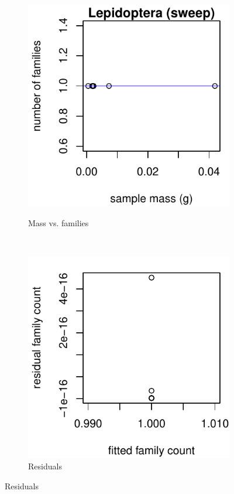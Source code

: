\documentclass[10pt,letterpaper,twocolumn]{article}
\begin{document}
\begin{figure}[h]
	\centering
	\begin{subfigure}[b]{0.15\textwidth}
		\caption{Mass vs. families}
		\includegraphics[width=\textwidth]{plots/mass-vs-count/scatter/2015_sweep_Lepidoptera_mass-vs-count.pdf}
		\label{fig:sweep_lepidoptera_scatter}
	\end{subfigure}
	~
	\begin{subfigure}[b]{0.15\textwidth}
		\caption{Residuals}
		\includegraphics[width=\textwidth]{plots/mass-vs-count/residual/2015_sweep_Lepidoptera_residual.pdf}

\end{subfigure}
\end{figure}
\end{document}
